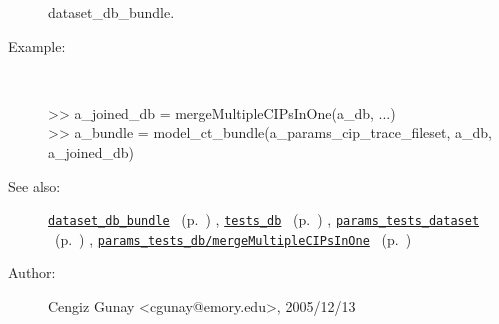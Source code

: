 \begin{description}
	dataset\_db\_bundle.
%
\item[Example:]~
\begin{lyxcode} >> a\_joined\_db = mergeMultipleCIPsInOne(a\_db, ...)
\\%
 >> a\_bundle = model\_ct\_bundle(a\_params\_cip\_trace\_fileset, a\_db, a\_joined\_db)
\\%
\end{lyxcode}
%
\item[See also:]%
\hyperlink{ref_dataset_db_bundle}{\texttt{dataset\_db\_bundle}}%
\ (p.~\pageref{ref_dataset_db_bundle})%
%
, \hyperlink{ref_tests_db}{\texttt{tests\_db}}%
\ (p.~\pageref{ref_tests_db})%
%
, \hyperlink{ref_params_tests_dataset}{\texttt{params\_tests\_dataset}}%
\ (p.~\pageref{ref_params_tests_dataset})%
%
, \hyperlink{ref_params_tests_db__mergeMultipleCIPsInOne}{\texttt{params\_tests\_db/mergeMultipleCIPsInOne}}%
\ (p.~\pageref{ref_params_tests_db__mergeMultipleCIPsInOne})%
%
%
\item[Author:]%
Cengiz Gunay <cgunay@emory.edu>, 2005/12/13
%
\end{description}
\methodline%
